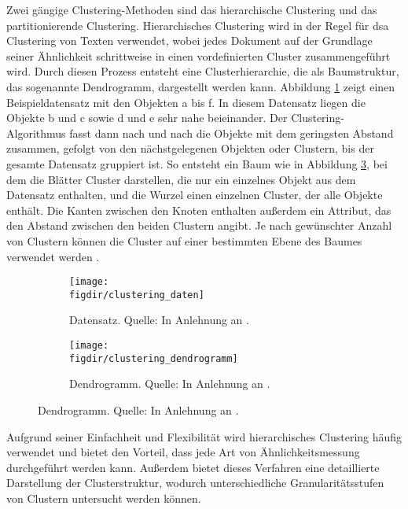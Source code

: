 Zwei gängige Clustering-Methoden sind das hierarchische Clustering und das partitionierende Clustering. Hierarchisches Clustering wird in der Regel für dsa Clustering von Texten verwendet, wobei jedes Dokument auf der Grundlage seiner Ähnlichkeit schrittweise in einen vordefinierten Cluster zusammengeführt wird. Durch diesen Prozess entsteht eine Clusterhierarchie, die als Baumstruktur, das sogenannte Dendrogramm, dargestellt werden kann. Abbildung \ref{f:clustering_daten} zeigt einen Beispieldatensatz mit den Objekten a bis f. In diesem Datensatz liegen die Objekte b und c sowie d und e sehr nahe beieinander. Der Clustering-Algorithmus fasst dann nach und nach die Objekte mit dem geringsten Abstand zusammen,  gefolgt von den nächstgelegenen Objekten oder Clustern, bis der gesamte Datensatz gruppiert ist. So entsteht ein Baum wie in Abbildung \ref{f:clustering_baum}, bei dem die Blätter Cluster darstellen, die nur ein einzelnes Objekt aus dem Datensatz enthalten, und die Wurzel einen einzelnen Cluster, der alle Objekte enthält. Die Kanten zwischen den Knoten enthalten außerdem ein Attribut, das den Abstand zwischen den beiden Clustern angibt. Je nach gewünschter Anzahl von Clustern können die Cluster auf einer bestimmten Ebene des Baumes verwendet werden \cite{Suyal.2014}.

\begin{figure}[htbp]
  \centering
  \begin{subfigure}[b]{0.47\linewidth}
    \texttt{[image: \\figdir/clustering\_daten]}
    \caption{Datensatz. Quelle: In Anlehnung an \cite{Bonthu.2023}.}
    \label{f:clustering_daten}
  \end{subfigure}
  \hfill
  \begin{subfigure}[b]{0.47\linewidth}
    \texttt{[image: \\figdir/clustering\_dendrogramm]}
    \caption{Dendrogramm. Quelle: In Anlehnung an \cite{Bonthu.2023}.}
    \label{f:clustering_baum}
  \end{subfigure}
\end{figure}

Aufgrund seiner Einfachheit und Flexibilität wird hierarchisches Clustering häufig verwendet und bietet den Vorteil, dass jede Art von Ähnlichkeitsmessung durchgeführt werden kann. Außerdem bietet dieses Verfahren eine detaillierte Darstellung der Clusterstruktur, wodurch unterschiedliche Granularitätsstufen von Clustern untersucht werden können.

